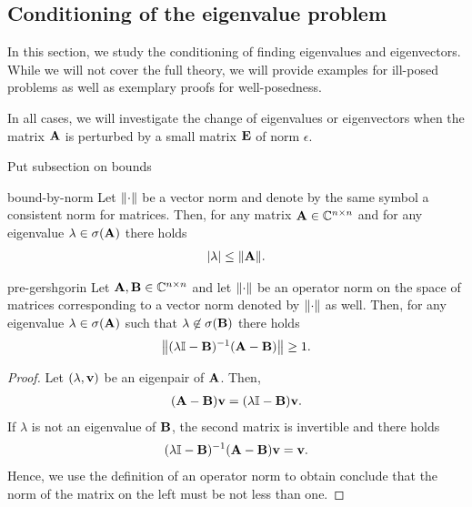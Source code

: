 \subsection{Conditioning of the eigenvalue problem}

In this section, we study the conditioning of finding eigenvalues and
eigenvectors. While we will not cover the full theory, we will provide
examples for ill-posed problems as well as exemplary proofs for
well-posedness.

In all cases, we will investigate the change of eigenvalues or
eigenvectors when the matrix $\mata$ is perturbed by a small matrix
$\mate$ of norm $\epsilon$.

\begin{todo}
  Put subsection on bounds
\end{todo}

\begin{Lemma}{bound-by-norm}
  Let $\norm{\cdot}$ be a vector norm and denote by the same symbol
  a consistent norm for matrices. Then, for any matrix $\mata\in\Cnn$
  and for any eigenvalue $\lambda\in\sigma(\mata)$ there holds
  \begin{gather}
    \abs{\lambda} \le \norm{\mata}.
  \end{gather}
\end{Lemma}

\begin{Lemma}{pre-gershgorin}
  Let $\mata,\matb\in\Cnn$ and let $\norm{\cdot}$ be an operator norm
  on the space of matrices corresponding to a vector norm denoted by
  $\norm{\cdot}$ as well. Then, for any eigenvalue
  $\lambda\in\sigma(\mata)$ such that $\lambda\not\in\sigma(\matb)$
  there holds
  \begin{gather}
    \norm*{(\lambda\id-\matb)^{-1}(\mata-\matb)} \ge 1.
  \end{gather}
\end{Lemma}

\begin{proof}
  Let $(\lambda,\vv)$ be an eigenpair of $\mata$. Then,
  \begin{gather}
    (\mata-\matb)\vv = (\lambda\id-\matb) \vv.
  \end{gather}
  If $\lambda$ is not an eigenvalue of $\matb$, the second matrix is invertible and there holds
  \begin{gather}
    (\lambda\id-\matb)^{-1}(\mata-\matb)\vv = \vv.
  \end{gather}
  Hence, we use the definition of an operator norm to obtain conclude
  that the norm of the matrix on the left must be not less than one.
\end{proof}

